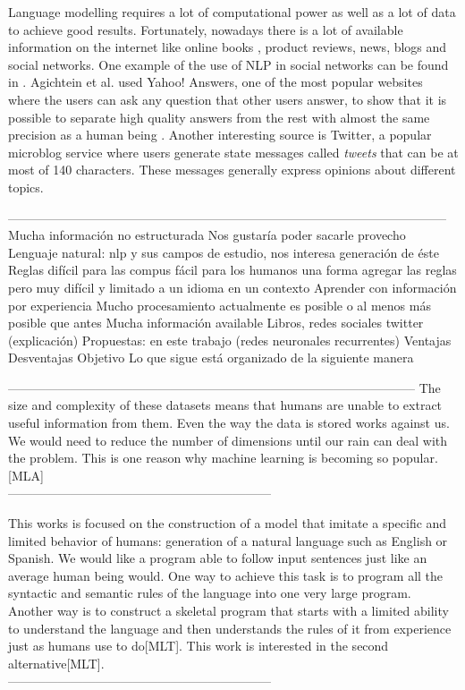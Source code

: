 Language modelling requires a lot of computational power as well as a lot of data to achieve good results. Fortunately, nowadays there is a lot of available information on the internet like online books , product reviews, news, blogs and social networks. One example of the use of NLP in social networks can be found in   \cite{agichtein2008finding}.  Agichtein et al. used Yahoo! Answers, one of the most popular websites where the users can ask any question that other users answer, to show that it is possible to separate high quality answers from the rest with almost the same precision as a human being .   Another interesting source is Twitter, a popular microblog service where users  generate state messages called \textit{tweets} that can be at most of 140 characters. These messages generally express opinions about different topics. 

---------------------------------------------------------------------------------------------------------
Mucha información no estructurada
Nos gustaría poder sacarle provecho
Lenguaje natural: nlp y sus campos de estudio, nos interesa generación de éste
Reglas
difícil para las compus fácil para los humanos
una forma agregar las reglas pero muy difícil y limitado a un idioma en un  contexto 
Aprender con información por experiencia
Mucho procesamiento actualmente es posible o al menos más posible que antes
	Mucha información available
Libros, redes sociales  twitter (explicación)
Propuestas: en este trabajo (redes neuronales recurrentes)
Ventajas
Desventajas
Objetivo
Lo que sigue está organizado de la siguiente manera

--------------------------------------------------------------------------------------------------
The size and complexity of these datasets means that humans are unable to extract useful information from them. Even the way the data is stored works against us. We would need to reduce the number of dimensions until our rain can deal with the problem. 
This is one reason why machine learning is becoming so popular.
[MLA]\\
---------------------------------------------------------------


This works is focused on the construction of a model that imitate a specific and limited behavior of humans: generation of a natural language such as English or Spanish. We would like a program able to follow input sentences just like an average human being would. One way to achieve this task is to program all the syntactic and semantic rules of the language into one very large program. Another way is to construct a skeletal program that starts with a limited ability to understand the language and then understands the rules of it from experience just as humans use to do[MLT]. This work is interested in the second alternative[MLT].\\
---------------------------------------------------------------


